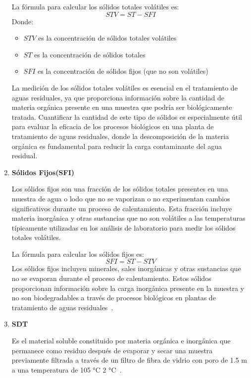 \begin{enumerate}[label=\textbf{$\bullet$}]
	La fórmula para calcular los sólidos totales volátiles es:
	\begin{equation*}
		STV = ST - SFI
	\end{equation*}
	Donde:
	\begin{itemize}
		\item $STV$ es la concentración de sólidos totales volátiles
		\item $ST$ es la concentración de sólidos totales
		\item $SFI$ es la concentración de sólidos fijos (que no son volátiles)
	\end{itemize}
	 La medición de los sólidos totales volátiles es esencial en el tratamiento de aguas residuales, ya que proporciona información sobre la cantidad de materia orgánica presente en una muestra que podría ser biológicamente tratada. Cuantificar la cantidad de este tipo de sólidos es especialmente útil para evaluar la eficacia de los procesos biológicos en una planta de tratamiento de aguas residuales, donde la descomposición de la materia orgánica es fundamental para reducir la carga contaminante del agua residual.\par
	\item \textbf{Sólidos Fijos(SFI)} \par
	Los sólidos fijos son una fracción de los sólidos totales presentes en una muestra de agua o lodo que no se vaporizan o no experimentan cambios significativos durante un proceso de calentamiento. Esta fracción incluye materia inorgánica y otras sustancias que no son volátiles a las temperaturas típicamente utilizadas en los análisis de laboratorio para medir los sólidos totales volátiles.\par
	La fórmula para calcular los sólidos fijos es:
	\begin{equation*}
		SFI = ST - STV
	\end{equation*}
	Los sólidos fijos incluyen minerales, sales inorgánicas y otras sustancias que no se evaporan durante el proceso de calentamiento. Estos sólidos proporcionan información sobre la carga inorgánica presente en la muestra y no son biodegradables a través de procesos biológicos en plantas de tratamiento de aguas residuales~\citep{martinez1999}.\par
	\item \textbf{\gls{SDT}} \par
	Es el material soluble constituido por materia orgánica e inorgánica que permanece como residuo después de evaporar y secar una muestra previamente filtrada a través de un filtro de fibra de vidrio con poro de 1.5 m a una temperatura de 105 °C  2 °C~\citep{Economia2015}.\par

\end{enumerate}
